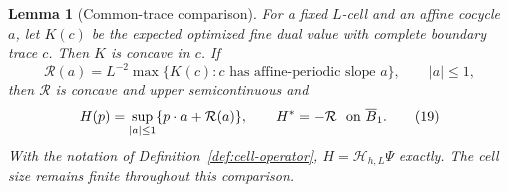 \documentclass{smfart}
\newtheorem{lemma}[theorem]{Lemma}
\theoremstyle{definition}
\newcommand{\1}{\mathbf 1}
\begin{document}
\begin{lemma}[Common-trace comparison]
For a fixed $L$-cell and an affine cocycle $a$, let $K(c)$ be the
expected optimized fine dual value with complete boundary trace $c$.
Then $K$ is concave in $c$. If
\begin{equation}
\mathcal R(a)=L^{-2}\max\{K(c):c\text{ has affine-periodic slope }a\},
\qquad |a|\leq1,
\tag{18}
\end{equation}
then $\mathcal R$ is concave and upper semicontinuous and
\begin{equation}
H(p)=\sup_ {|a|\leq1}\{p\cdot a+\mathcal R(a)\},\qquad H^*=-\mathcal R
\ \hbox{ on }\overline B_ 1.
\tag{19}
\end{equation}
With the notation of Definition~\ref{def:cell-operator},
$H=\mathcal H_ {h,L}\Psi$ exactly.  The cell size remains finite throughout this comparison.

\end{lemma}
\end{document}
